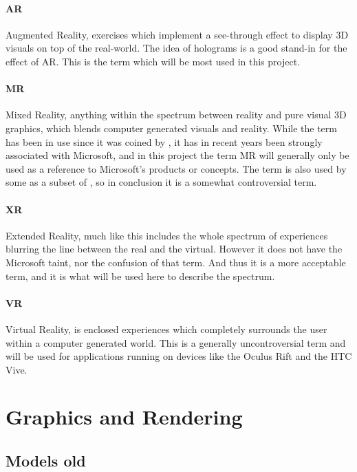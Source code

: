 \paragraph*{AR}\label{para:ar} Augmented Reality, exercises which implement a see-through effect to display 3D visuals on top of the real-world. The idea of holograms is a good stand-in for the effect of AR. This is the term which will be most used in this project. 

\paragraph*{MR}\label{para:mr} Mixed Reality, anything within the spectrum between reality and pure visual 3D graphics, which blends computer generated visuals and reality. While the term has been in use since it was coined by \citet{Milgram1994}, it has in recent years been strongly associated with Microsoft, and in this project the term MR will generally only be used as a reference to Microsoft's products or concepts. The term is also used by some as a subset of , so in conclusion it is a somewhat controversial term. 


\paragraph*{XR}\label{para:xr} Extended Reality, much like  this includes the whole spectrum of experiences blurring the line between the real and the virtual. However it does not have the Microsoft taint, nor the confusion of that term. And thus it is a more acceptable term, and it is what will be used here to describe the spectrum.

\paragraph*{VR}\label{para:vr} Virtual Reality, is enclosed experiences which completely surrounds the user within a computer generated world. This is a generally uncontroversial term and will be used for applications running on devices like the Oculus Rift and the HTC Vive.


\section{Graphics and Rendering}

\subsection*{Models old}

